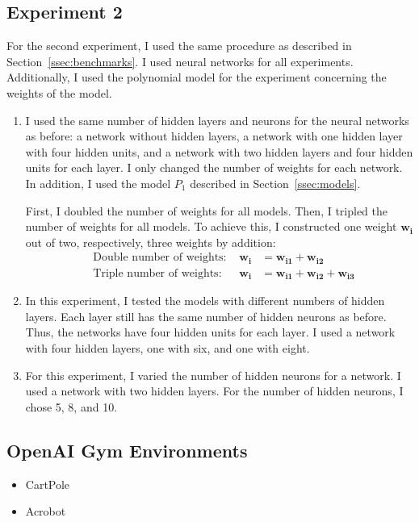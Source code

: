 \subsection{Experiment 2}
For the second experiment, I used the same procedure as described in Section~\ref{ssec:benchmarks}. I used neural networks for all experiments. Additionally, I used the polynomial model for the experiment concerning the weights of the model.
\begin{enumerate}
  \item I used the same number of hidden layers and neurons for the neural networks as before: a network without hidden layers, a network with one hidden layer with four hidden units, and a network with two hidden layers and four hidden units for each layer. I only changed the number of weights for each network. In addition, I used the model $P_1$ described in Section~\ref{ssec:models}.

  First, I doubled the number of weights for all models. Then, I tripled the number of weights for all models. To achieve this, I constructed one weight $\mathbf{w_i}$ out of two, respectively, three weights by addition:
  \begin{align*}
    &\text{Double number of weights: } &\mathbf{w_i} &= \mathbf{w_{i1}} + \mathbf{w_{i2}} \\
    &\text{Triple number of weights: } &\mathbf{w_{i}} &= \mathbf{w_{i1}} + \mathbf{w_{i2}} + \mathbf{w_{i3}}
  \end{align*}
  \item In this experiment, I tested the models with different numbers of hidden layers. Each layer still has the same number of hidden neurons as before. Thus, the networks have four hidden units for each layer. I used a network with four hidden layers, one with six, and one with eight.
  \item For this experiment, I varied the number of hidden neurons for a network. I used a network with two hidden layers. For the number of hidden neurons, I chose 5, 8, and 10.
\end{enumerate}

\subsection{OpenAI Gym Environments}
\begin{itemize}
  \item CartPole
  \item Acrobot
\end{itemize}

